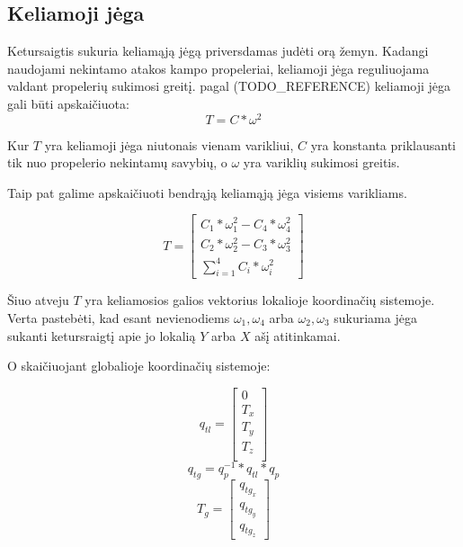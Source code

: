 \documentclass[12pt, a4paper, lithuanian, final]{article}
\begin{document}
\subsection{Keliamoji jėga}

Ketursaigtis sukuria keliamąją jėgą priversdamas judėti orą žemyn.
Kadangi naudojami nekintamo atakos kampo propeleriai, keliamoji jėga reguliuojama valdant propelerių sukimosi greitį.
pagal (TODO\_REFERENCE) keliamoji jėga gali būti apskaičiuota:
\begin{equation}
	T = C * \omega^2
\end{equation}

Kur $T$ yra keliamoji jėga niutonais vienam varikliui, $C$ yra konstanta priklausanti tik nuo propelerio nekintamų savybių, o $\omega$ yra variklių sukimosi greitis.

Taip pat galime apskaičiuoti bendrąją keliamąją jėga visiems varikliams.

\begin{equation}
	T = \left[
		\begin{array}{c}
			C_{1} * \omega_{1}^2 - C_{4} * \omega_{4}^2 \\
			C_{2} * \omega_{2}^2 - C_{3} * \omega_{3}^2\\
			\displaystyle\sum_{i=1}^{4} C_i * \omega_i^2
		\end{array}
	\right]
\end{equation}

Šiuo atveju $T$ yra keliamosios galios vektorius lokalioje koordinačių sistemoje.
Verta pastebėti, kad esant nevienodiems $\omega_{1}, \omega_{4}$ arba $\omega_{2}, \omega_{3}$ sukuriama jėga sukanti ketursraigtį apie jo lokalią $Y$ arba $X$ ašį atitinkamai.

O skaičiuojant globalioje koordinačių sistemoje:

\begin{equation}
q_{tl} = \left[
		\begin{array}{c}
			0\\
			T_x\\
			T_y\\
			T_z\\
		\end{array}
		\right]
\end{equation}
\begin{equation}
	q_{tg} = q_{p}^{-1} * q_{tl} * q_{p}
\end{equation}
\begin{equation}
	T_g = \left[
		\begin{array}{c}
			q_{tg_x} \\
			q_{tg_y} \\
			q_{tg_z}
		\end{array}
	\right]
\end{equation}
\end{document}
